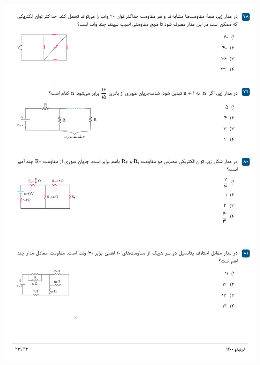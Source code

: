 \documentclass{book}
\begin{document}
\includegraphics[width=\textwidth]{"pages/23"}
\end{document}
